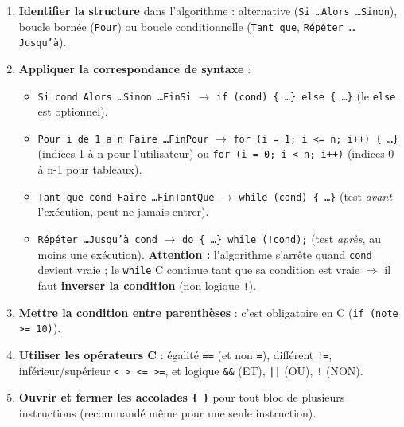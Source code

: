 \documentclass[11pt]{article}
\begin{document}
\begin{methode}
\begin{enumerate}
\item \textbf{Identifier la structure} dans l'algorithme : alternative (\texttt{Si \ldots Alors \ldots Sinon}), boucle bornée (\texttt{Pour}) ou boucle conditionnelle (\texttt{Tant que}, \texttt{Répéter \ldots Jusqu'à}).
\item \textbf{Appliquer la correspondance de syntaxe} :
\begin{itemize}
\item \texttt{Si cond Alors \ldots Sinon \ldots FinSi} $\rightarrow$ \texttt{if (cond) \{ \ldots \} else \{ \ldots \}} (le \texttt{else} est optionnel).
\item \texttt{Pour i de 1 a n Faire \ldots FinPour} $\rightarrow$ \texttt{for (i = 1; i <= n; i++) \{ \ldots \}} (indices 1 à n pour l'utilisateur) ou \texttt{for (i = 0; i < n; i++)} (indices 0 à n-1 pour tableaux).
\item \texttt{Tant que cond Faire \ldots FinTantQue} $\rightarrow$ \texttt{while (cond) \{ \ldots \}} (test \emph{avant} l'exécution, peut ne jamais entrer).
\item \texttt{Répéter \ldots Jusqu'à cond} $\rightarrow$ \texttt{do \{ \ldots \} while (!cond);} (test \emph{après}, au moins une exécution). \textbf{Attention :} l'algorithme s'arrête quand \texttt{cond} devient vraie ; le \texttt{while} C continue tant que sa condition est vraie $\Rightarrow$ il faut \textbf{inverser la condition} (non logique \texttt{!}).
\end{itemize}
\item \textbf{Mettre la condition entre parenthèses} : c'est obligatoire en C (\texttt{if (note >= 10)}).
\item \textbf{Utiliser les opérateurs C} : égalité \texttt{==} (et non \texttt{=}), différent \texttt{!=}, inférieur/supérieur \texttt{< > <= >=}, et logique \texttt{\&\&} (ET), \texttt{||} (OU), \texttt{!} (NON).
\item \textbf{Ouvrir et fermer les accolades \texttt{\{ \}}} pour tout bloc de plusieurs instructions (recommandé même pour une seule instruction).
\end{enumerate}
\end{methode}
\end{document}

